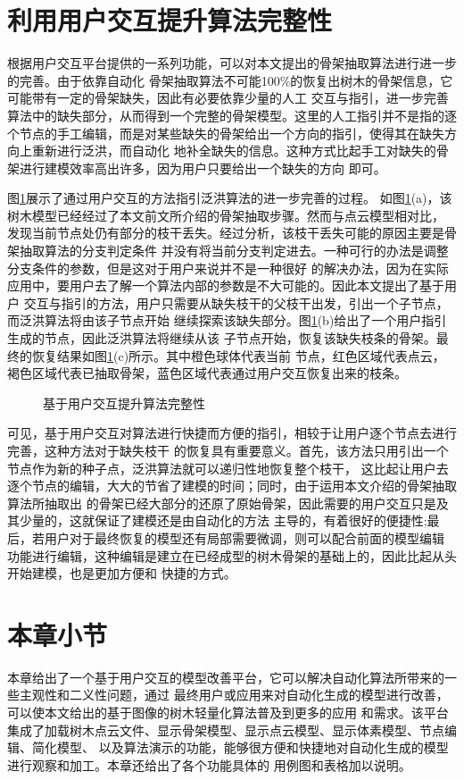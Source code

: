 \clearpage
\section{利用用户交互提升算法完整性}
根据用户交互平台提供的一系列功能，可以对本文提出的骨架抽取算法进行进一步的完善。由于依靠自动化
骨架抽取算法不可能100\%的恢复出树木的骨架信息，它可能带有一定的骨架缺失，因此有必要依靠少量的人工
交互与指引，进一步完善算法中的缺失部分，从而得到一个完整的骨架模型。这里的人工指引并不是指的逐
个节点的手工编辑，而是对某些缺失的骨架给出一个方向的指引，使得其在缺失方向上重新进行泛洪，而自动化
地补全缺失的信息。这种方式比起手工对缺失的骨架进行建模效率高出许多，因为用户只要给出一个缺失的方向
即可。

图\ref{fig:intalg}展示了通过用户交互的方法指引泛洪算法的进一步完善的过程。
如图\ref{fig:intalg}(a)，该树木模型已经经过了本文前文所介绍的骨架抽取步骤。然而与点云模型相对比，
发现当前节点处仍有部分的枝干丢失。经过分析，该枝干丢失可能的原因主要是骨架抽取算法的分支判定条件
并没有将当前分支判定进去。一种可行的办法是调整分支条件的参数，但是这对于用户来说并不是一种很好
的解决办法，因为在实际应用中，要用户去了解一个算法内部的参数是不大可能的。因此本文提出了基于用户
交互与指引的方法，用户只需要从缺失枝干的父枝干出发，引出一个子节点，而泛洪算法将由该子节点开始
继续探索该缺失部分。图\ref{fig:intalg}(b)给出了一个用户指引生成的节点，因此泛洪算法将继续从该
子节点开始，恢复该缺失枝条的骨架。最终的恢复结果如图\ref{fig:intalg}(c)所示。其中橙色球体代表当前
节点，红色区域代表点云，褐色区域代表已抽取骨架，蓝色区域代表通过用户交互恢复出来的枝条。

\begin{figure}[H]
	\centering
	\hfill
	\hfill
	\caption{基于用户交互提升算法完整性}
	\label{fig:intalg}
\end{figure}

可见，基于用户交互对算法进行快捷而方便的指引，相较于让用户逐个节点去进行完善，这种方法对于缺失枝干
的恢复具有重要意义。首先，该方法只用引出一个节点作为新的种子点，泛洪算法就可以递归性地恢复整个枝干，
这比起让用户去逐个节点的编辑，大大的节省了建模的时间；同时，由于运用本文介绍的骨架抽取算法所抽取出
的骨架已经大部分的还原了原始骨架，因此需要的用户交互只是及其少量的，这就保证了建模还是由自动化的方法
主导的，有着很好的便捷性;最后，若用户对于最终恢复的模型还有局部需要微调，则可以配合前面的模型编辑
功能进行编辑，这种编辑是建立在已经成型的树木骨架的基础上的，因此比起从头开始建模，也是更加方便和
快捷的方式。

\section{本章小节}
本章给出了一个基于用户交互的模型改善平台，它可以解决自动化算法所带来的一些主观性和二义性问题，通过
最终用户或应用来对自动化生成的模型进行改善，可以使本文给出的基于图像的树木轻量化算法普及到更多的应用
和需求。该平台集成了加载树木点云文件、显示骨架模型、显示点云模型、显示体素模型、节点编辑、简化模型、
以及算法演示的功能，能够很方便和快捷地对自动化生成的模型进行观察和加工。本章还给出了各个功能具体的
用例图和表格加以说明。
